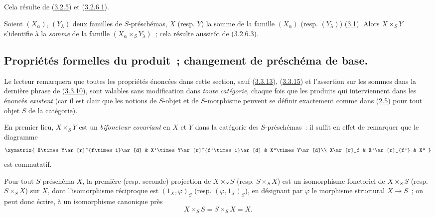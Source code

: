 Cela résulte de (\hyperref[I.3.2.5-fr]{3.2.5}) et
(\hyperref[I.3.2.6.1-fr]{3.2.6.1}).

\begin{env}[3.2.8]
\label{I.3.2.8-fr}
Soient $(X_\alpha)$, $(Y_\lambda)$ deux familles de $S$-préschémas, $X$
(resp. $Y$) la somme de la famille $(X_\alpha)$ (resp. $(Y_\lambda)$)
(\hyperref[subsection:I.3.1-fr]{3.1}). Alors $X\times_S Y$ s'identifie à la
\emph{somme} de la famille $(X_\alpha\times_S Y_\lambda)$~; cela résulte
aussitôt de (\hyperref[I.3.2.6.3-fr]{3.2.6.3}).
\end{env}

\subsection{Propriétés formelles du produit~; changement de préschéma de base.}
\label{subsection:I.3.3-fr}

\begin{env}[3.3.1]
\label{I.3.3.1-fr}
Le lecteur remarquera que toutes les propriétés énoncées dans cette section,
sauf (\hyperref[I.3.3.13-fr]{3.3.13}), (\hyperref[I.3.3.15-fr]{3.3.15}) et l'assertion sur les sommes dans la dernière phrase de
(\hyperref[I.3.3.10-fr]{3.3.10}), sont valables sans modification dans
\emph{toute catégorie}, chaque fois que les produits qui interviennent dans
les énoncés \emph{existent} (car il est clair que les notions de $S$-objet et
de $S$-morphisme peuvent se définir exactement comme dans
(\hyperref[subsection:I.2.5-fr]{2.5}) pour tout objet $S$ de la catégorie).
\end{env}

\begin{env}[3.3.2]
\label{I.3.3.2-fr}
En premier lieu, $X\times_S Y$ est un \emph{bifoncteur covariant} en $X$ et
$Y$ dans la catégorie des $S$-préschémas~: il suffit en effet de remarquer
que le diagramme
\[
  \xymatrix{
    X\times Y\ar[r]^{f\times 1}\ar[d] &
    X'\times Y\ar[r]^{f'\times 1}\ar[d] &
    X''\times Y\ar[d]\\
    X\ar[r]_f & X'\ar[r]_{f'} & X''
  }
\]
est commutatif.
\end{env}

\begin{proposition}[3.3.3]
\label{I.3.3.3-fr}
Pour tout $S$-préschéma $X$, la première \textup{(resp.} seconde) projection de
$X\times_S S$ \textup{(resp. $S\times_S X$)} est un isomorphisme fonctoriel de
$X\times_S S$ \textup{(resp. $S\times_S X$)} sur $X$, dont l'isomorphisme réciproque
est $(1_X,\varphi)_S$ \textup{(resp. $(\varphi,1_X)_S$)}, en désignant par $\varphi$
le morphisme structural $X\to S$~; on peut donc écrire, à un isomorphisme
canonique près
\[
  X\times_S S=S\times_S X=X.
\]
\end{proposition}

